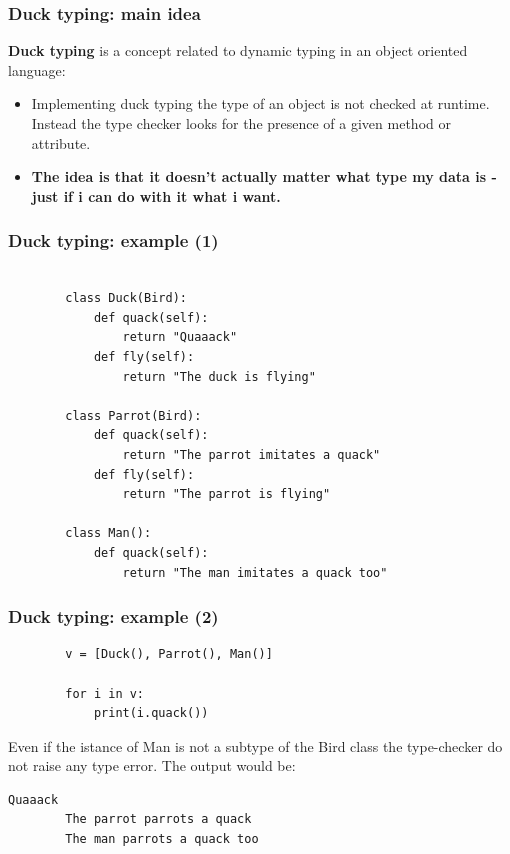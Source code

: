 \documentclass[xcolor ={table,usenames,dvipsnames}]{beamer}
\theoremstyle{definition}
\begin{document}
	\begin{frame}
		\frametitle{Duck typing: main idea}
		\textbf{Duck typing} is a concept related to dynamic typing in an object oriented language:
		\begin{itemize}
			\item Implementing duck typing the type of an object is not checked at runtime. Instead the type checker looks for the presence of a given method or attribute.
			\item \textbf{The idea is that it doesn't actually matter what type my data is - just if i can do with it what i want.}
		\end{itemize}
	\end{frame}

	\begin{frame}[fragile]
		\frametitle{Duck typing: example (1)}
		\begin{lstlisting}[]
		
		class Duck(Bird):
			def quack(self):
				return "Quaaack"
			def fly(self):
				return "The duck is flying"
		
		class Parrot(Bird):
			def quack(self):
				return "The parrot imitates a quack"
			def fly(self):
				return "The parrot is flying"
		
		class Man():
			def quack(self):
				return "The man imitates a quack too"

		\end{lstlisting}
	\end{frame}

	\begin{frame}[fragile]
		\frametitle{Duck typing: example (2)}
		\begin{lstlisting}	
		v = [Duck(), Parrot(), Man()]
		
		for i in v:
			print(i.quack())
		\end{lstlisting}
		Even if the istance of Man is not a subtype of the Bird class the type-checker do not raise any type error. The output would be:
		
		\begin{lstlisting}[keywordstyle=\color{black},
		commentstyle=\color{black},
		stringstyle=\color{black}.]	
		Quaaack
		The parrot parrots a quack
		The man parrots a quack too
		\end{lstlisting}
		
		
		
	\end{frame}
\end{document}
